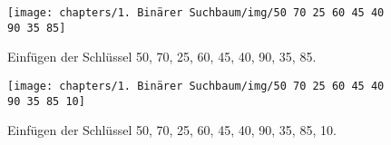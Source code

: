         \begin{figure}[h]
            \centering
    \texttt{[image: chapters/1. Binärer Suchbaum/img/50 70 25 60 45 40 90 35 85]}
    \caption{Einfügen der Schlüssel 50, 70, 25, 60, 45, 40, 90, 35, 85.}
            \vspace{64}
\end{figure}

\begin{figure}[h]
    \centering
    \texttt{[image: chapters/1. Binärer Suchbaum/img/50 70 25 60 45 40 90 35 85 10]}
    \caption{Einfügen der Schlüssel 50, 70, 25, 60, 45, 40, 90, 35, 85, 10.}
\end{figure}